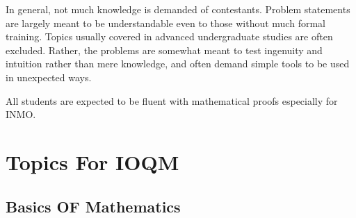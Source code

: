 \documentclass[11pt]{scrartcl}
\begin{document}
In general, not much knowledge is demanded of contestants.
Problem statements are largely meant to be understandable even to those
without much formal training.
Topics usually covered in advanced undergraduate studies are often excluded.
Rather, the problems are somewhat meant to
test ingenuity and intuition rather than mere knowledge,
and often demand simple tools to be used in unexpected ways.

All students are expected to be fluent with mathematical proofs especially for INMO.

\section{Topics For  IOQM}
\subsection{Basics OF Mathematics}
\end{document}
